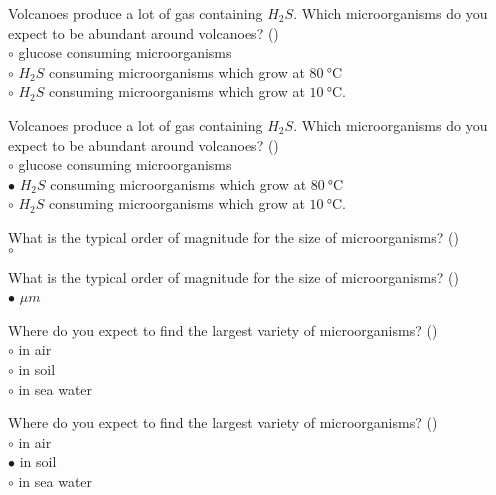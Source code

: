 \documentclass[]{beamer}
\begin{document}
\begin{frame}[shrink] {}
\addtocounter{questions}{1}
\color{blue}
Volcanoes produce a lot of gas containing $H_2S$. Which microorganisms do
you expect to be abundant around volcanoes? ()\\
\color{black}
\setlength{\parindent}{-0.4cm}
{\color{red}$\circ$} glucose consuming microorganisms\\
{\color{red}$\circ$} $H_2S$ consuming microorganisms which grow at $\SI{80}{\degreeCelsius}$\\
{\color{red}$\circ$} $H_2S$ consuming microorganisms which grow at $\SI{10}{\degreeCelsius}$.
\end{frame}
\begin{frame}[shrink] {}
\addtocounter{answers}{1}
\color{blue}
Volcanoes produce a lot of gas containing $H_2S$. Which microorganisms do
you expect to be abundant around volcanoes? ()\\
\color{black}
\setlength{\parindent}{-0.4cm}
{\color{red}$\circ$} glucose consuming microorganisms\\
{\color{red}$\bullet$} $H_2S$ consuming microorganisms which grow at $\SI{80}{\degreeCelsius}$\\
{\color{red}$\circ$} $H_2S$ consuming microorganisms which grow at $\SI{10}{\degreeCelsius}$.
\end{frame}
\begin{frame}[shrink] {}
\addtocounter{questions}{1}
\color{blue}
What is the typical order of magnitude for the size of microorganisms? ()\\
\color{black}
\setlength{\parindent}{-0.4cm}
{\color{red}$\circ$}\\
\end{frame}
\begin{frame}[shrink] {}
\addtocounter{answers}{1}
\color{blue}
What is the typical order of magnitude for the size of microorganisms? ()\\
\color{black}
\setlength{\parindent}{-0.4cm}
{\color{red}$\bullet$} ${\mu}m$
\end{frame}
\begin{frame}[shrink] {}
\addtocounter{questions}{1}
\color{blue}
Where do you expect to find the largest variety of microorganisms? ()\\
\color{black}
\setlength{\parindent}{-0.4cm}
{\color{red}$\circ$} in air\\
{\color{red}$\circ$} in soil\\
{\color{red}$\circ$} in sea water\\
\end{frame}
\begin{frame}[shrink] {}
\addtocounter{answers}{1}
\color{blue}
Where do you expect to find the largest variety of microorganisms? ()\\
\color{black}
\setlength{\parindent}{-0.4cm}
{\color{red}$\circ$} in air\\
{\color{red}$\bullet$} in soil\\
{\color{red}$\circ$} in sea water\\
\end{frame}
\end{document}
